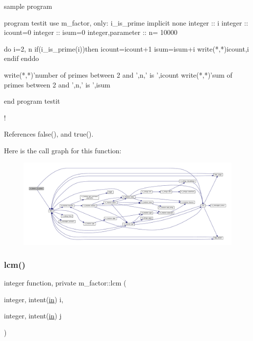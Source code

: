 \begin{DoxyVerb}sample program

 program testit
 use m_factor, only: i_is_prime
 implicit none
 integer  :: i
 integer  :: icount=0
 integer  :: isum=0
 integer,parameter :: n= 10000

 do i=2, n
    if(i_is_prime(i))then
       icount=icount+1
       isum=isum+i
       write(*,*)icount,i
    endif
 enddo

 write(*,*)'number of primes between 2 and ',n,' is ',icount
 write(*,*)'sum of primes between 2 and ',n,' is ',isum

 end program testit
\end{DoxyVerb}
 ! 

References false(), and true().

Here is the call graph for this function\+:
\nopagebreak
\begin{figure}[H]
\begin{center}
\leavevmode
\includegraphics[width=350pt]{namespacem__factor_afcca43d3d524f6d11d54bbfd475e60d5_cgraph}
\end{center}
\end{figure}
\mbox{\label{namespacem__factor_a363e0b451d99647a6230a308ffccc73c}} 
\subsubsection{\texorpdfstring{lcm()}{lcm()}}
{\footnotesize\ttfamily integer function, private m\+\_\+factor\+::lcm (\begin{DoxyParamCaption}\item[{integer, intent(\hyperlink{M__journal_83_8txt_afce72651d1eed785a2132bee863b2f38}{in})}]{i,  }\item[{integer, intent(\hyperlink{M__journal_83_8txt_afce72651d1eed785a2132bee863b2f38}{in})}]{j }\end{DoxyParamCaption})\hspace{0.3cm}{\ttfamily [private]}}



